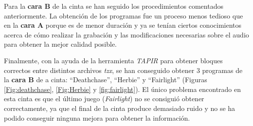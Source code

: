 \documentclass{article}
\begin{document}
\newpage
Para la \textbf{cara B} de la cinta se han seguido los procedimientos comentados anteriormente. La obtención de los programas fue un proceso menos tedioso que en la \textbf{cara A} porque es de menor duración y ya se tenían ciertos conocimientos acerca de cómo realizar la grabación y las modificaciones necesarias sobre el audio para obtener la mejor calidad posible.

Finalmente, con la ayuda de la herramienta \textit{TAPIR} para obtener bloques correctos entre distintos archivos \textit{tzx}, se han conseguido obtener 3 programas de la \textbf{cara B} de a cinta: ``Deathchase'', ``Herbie'' y ``Fairlight'' (Figuras \ref{Fig:deathchase}, \ref{Fig:Herbie} y \ref{fig:fairlight}). El único problema encontrado en esta cinta es que el último juego (\textit{Fairlight}) no se consiguió obtener correctamente, ya que el final de la cinta produce demasiado ruido y no se ha podido conseguir ninguna mejora para obtener la información.\\
\end{document}
